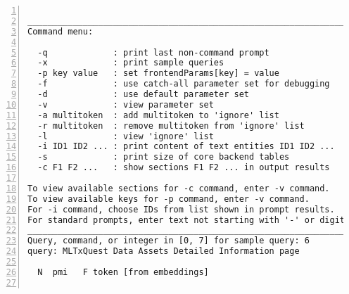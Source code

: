 \documentclass[10pt]{article}
\begin{document}
{\begin{lstlisting}[numbers=left,basicstyle=\ttfamily\footnotesize, frame=none] % \rmfamily, \ttfamily, \sffamily

____________________________________________________________________
Command menu:

  -q             : print last non-command prompt
  -x             : print sample queries
  -p key value   : set frontendParams[key] = value
  -f             : use catch-all parameter set for debugging
  -d             : use default parameter set
  -v             : view parameter set
  -a multitoken  : add multitoken to 'ignore' list
  -r multitoken  : remove multitoken from 'ignore' list
  -l             : view 'ignore' list
  -i ID1 ID2 ... : print content of text entities ID1 ID2 ...
  -s             : print size of core backend tables
  -c F1 F2 ...   : show sections F1 F2 ... in output results

To view available sections for -c command, enter -v command.
To view available keys for -p command, enter -v command.
For -i command, choose IDs from list shown in prompt results.
For standard prompts, enter text not starting with '-' or digit.
____________________________________________________________________
Query, command, or integer in [0, 7] for sample query: 6
query: MLTxQuest Data Assets Detailed Information page

  N  pmi   F token [from embeddings]                                     word [from prompt]


\end{lstlisting}}
\end{document}
